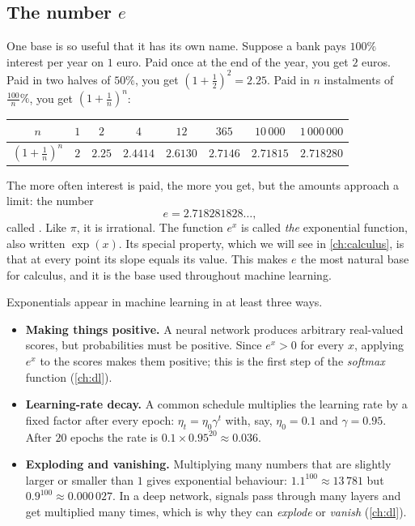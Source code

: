 \subsection{The number \texorpdfstring{$e$}{e}}

One base is so useful that it has its own name. Suppose a bank pays $100\%$
interest per year on $1$ euro. Paid once at the end of the year, you get
$2$ euros. Paid in two halves of $50\%$, you get $(1 + \tfrac12)^2 = 2.25$.
Paid in $n$ instalments of $\tfrac{100}{n}\%$, you get
$\left(1 + \tfrac1n\right)^n$:
\begin{center}
\begin{tabular}{c|ccccccc}
$n$ & $1$ & $2$ & $4$ & $12$ & $365$ & $10\,000$ & $1\,000\,000$\\
\hline
$\left(1 + \frac1n\right)^n$ & $2$ & $2.25$ & $2.4414$ & $2.6130$ & $2.7146$ &
  $2.71815$ & $2.718280$
\end{tabular}
\end{center}
The more often interest is paid, the more you get, but the amounts approach a
limit: the number
\[
  e = 2.718281828\ldots,
\]
called . Like $\pi$, it is
irrational. The function $e^x$ is called \emph{the} exponential function,
also written $\exp(x)$. Its special property, which we will see in
\cref{ch:calculus}, is that at every point its slope equals its value. This
makes $e$ the most natural base for calculus, and it is the base used
throughout machine learning.

\begin{mlnote}
Exponentials appear in machine learning in at least three ways.
\begin{itemize}
  \item \textbf{Making things positive.} A neural network produces arbitrary
    real-valued scores, but probabilities must be positive. Since $e^x > 0$ for
    every $x$, applying $e^x$ to the scores makes them positive; this is the
    first step of the \emph{softmax} function (\cref{ch:dl}).
  \item \textbf{Learning-rate decay.} A common schedule multiplies the
    learning rate by a fixed factor after every epoch:
    $\eta_t = \eta_0 \gamma^t$ with, say, $\eta_0 = 0.1$ and $\gamma = 0.95$.
    After $20$ epochs the rate is $0.1 \times 0.95^{20} \approx 0.036$.
  \item \textbf{Exploding and vanishing.} Multiplying many numbers that are
    slightly larger or smaller than $1$ gives exponential behaviour:
    $1.1^{100} \approx 13\,781$ but $0.9^{100} \approx 0.000\,027$. In a deep
    network, signals pass through many layers and get multiplied many times,
    which is why they can \emph{explode} or \emph{vanish}
    (\cref{ch:dl}).
\end{itemize}
\end{mlnote}

